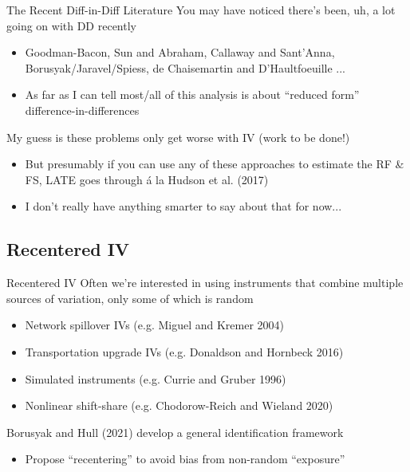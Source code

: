 \documentclass{beamer}
\begin{document}
\begin{frame}{The Recent Diff-in-Diff Literature}
You may have noticed there's been, uh, a lot going on with DD recently\smallskip
\begin{itemize}
\item Goodman-Bacon, Sun and Abraham, Callaway and Sant'Anna, Borusyak/Jaravel/Spiess, de Chaisemartin and D'Haultfoeuille ...\smallskip
\item As far as I can tell most/all of this analysis is about ``reduced form'' difference-in-differences
\end{itemize}\medskip\pause{}
My guess is these problems only get worse with IV (work to be done!)\smallskip
\begin{itemize}
\item But presumably if you can use any of these approaches to estimate the RF \& FS, LATE goes through \'{a} la Hudson et al. (2017)\smallskip
\item I don't really have anything smarter to say about that for now...
\end{itemize}
\end{frame}

\subsection{Recentered IV}
\begin{frame}{Recentered IV}
Often we're interested in using instruments that combine multiple sources of variation, only some of which is random \smallskip
\begin{itemize}
\item Network spillover IVs (e.g. Miguel and Kremer 2004)\smallskip
\item Transportation upgrade IVs (e.g. Donaldson and Hornbeck 2016)\smallskip
\item Simulated instruments (e.g. Currie and Gruber 1996)\smallskip
\item Nonlinear shift-share (e.g. Chodorow-Reich and Wieland 2020)
\end{itemize}\bigskip\pause{}

Borusyak and Hull (2021) develop a general identification framework\smallskip
\begin{itemize}
\item Propose ``recentering'' to avoid bias from non-random ``exposure''
\end{itemize}
\end{frame}
\end{document}
